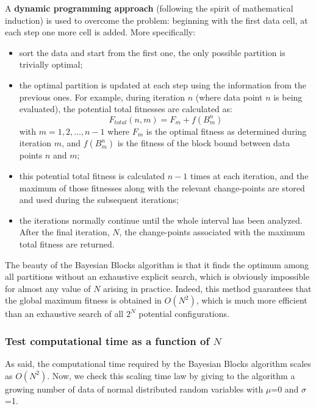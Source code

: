 \documentclass[prb,twocolumn]{revtex4-1}
\begin{document}
A \textbf{dynamic programming approach} (following the spirit of mathematical induction) is used to overcome the problem: beginning with the first data cell, at each step one more cell is added. More specifically:
\begin{itemize}

    \item sort the data and start from the first one, the only possible partition is trivially optimal;

    \item the optimal partition is updated at each step using the information from the previous ones. For example, during iteration $n$ (where data point $n$ is being evaluated), the potential total fitnesses are calculated as:
    \begin{equation}
     F_{total} (n,m) = F_m + f(B_m^n)  
     \end{equation}
    with $m=1,2,\dots,n-1$ where $F_m$ is the optimal fitness as determined during iteration $m$, and $f(B_m^n)$ is the fitness of the block bound between data points $n$ and $m$;

   \item this potential total fitness is calculated $n-1$ times at each iteration, and the maximum of those fitnesses along with the relevant change-points are stored and used during the subsequent iterations;

   \item the iterations normally continue until the whole interval has been analyzed. After the final iteration, $N$, the change-points associated with the maximum total fitness are returned.
\end{itemize}
The beauty of the Bayesian Blocks algorithm is that it finds the optimum among all partitions without an exhaustive explicit search, which is obviously impossible for almost any value of $N$ arising in practice. Indeed, this method guarantees that the global maximum fitness is obtained in $O(N^2)$, which is much more efficient than an exhaustive search of all $2^N$ potential configurations.


\subsubsection{Test computational time as a function of $N$}

As said, the computational time required by the Bayesian Blocks algorithm scales as $O(N^2)$. 
Now, we check this scaling time law by giving to the algorithm a growing number of data of normal distributed random variables with $\mu$=0 and $\sigma$=1.
\end{document}
